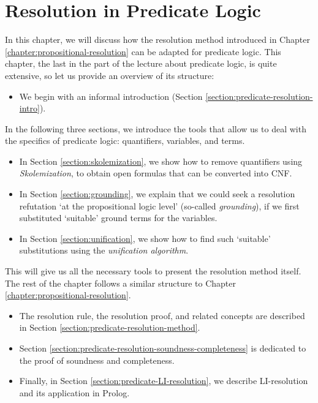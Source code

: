 \chapter{Resolution in Predicate Logic} 
\label{chapter:predicate-resolution}

In this chapter, we will discuss how the resolution method introduced in Chapter \ref{chapter:propositional-resolution} can be adapted for predicate logic. This chapter, the last in the part of the lecture about predicate logic, is quite extensive, so let us provide an overview of its structure:

\begin{itemize}
    \item We begin with an informal introduction (Section \ref{section:predicate-resolution-intro}).
\end{itemize}
In the following three sections, we introduce the tools that allow us to deal with the specifics of predicate logic: quantifiers, variables, and terms.
\begin{itemize}
    \item In Section \ref{section:skolemization}, we show how to remove quantifiers using \emph{Skolemization}, to obtain open formulas that can be converted into CNF.
    \item In Section \ref{section:grounding}, we explain that we could seek a resolution refutation `at the propositional logic level' (so-called \emph{grounding}), if we first substituted `suitable' ground terms for the variables.
    \item In Section \ref{section:unification}, we show how to find such `suitable' substitutions using the \emph{unification algorithm}.
\end{itemize}
This will give us all the necessary tools to present the resolution method itself. The rest of the chapter follows a similar structure to Chapter \ref{chapter:propositional-resolution}.
\begin{itemize}
    \item The resolution rule, the resolution proof, and related concepts are described in Section \ref{section:predicate-resolution-method}.
    \item Section \ref{section:predicate-resolution-soundness-completeness} is dedicated to the proof of soundness and completeness.
    \item Finally, in Section \ref{section:predicate-LI-resolution}, we describe LI-resolution and its application in Prolog.
\end{itemize}

